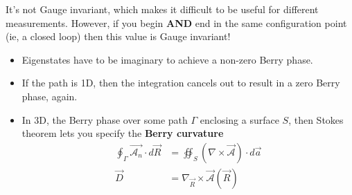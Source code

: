 \documentclass[../mattg_ti-fi_lit-review.tex]{subfiles}
\begin{document}
\begin{itemize}
			It's not Gauge invariant, which makes it difficult to be useful for different measurements. However, if you begin \textbf{AND} end in the same configuration point (ie, a closed loop) then this value is Gauge invariant!
			\begin{itemize}
				\item Eigenstates have to be imaginary to achieve a non-zero Berry phase.
				\item If the path is 1D, then the integration cancels out to result in a zero Berry phase, again.
				\item In 3D, the Berry phase over some path $\Gamma$ enclosing a surface $S$, then Stokes theorem lets you specify the \textbf{Berry curvature} 
				\begin{align}
					\oint_\Gamma \vec{\mathcal{A}_n}\cdot d\vec{R} &= \oiint_S \left(\nabla\times\vec{\mathcal{A}}\right)\cdot d\vec{a}\\
					\vec{D}&=\nabla_{\vec{R}}\times\vec{\mathcal{A}}(\vec{R})
				\end{align}
			\end{itemize}
	\end{itemize}
		
\end{document}
